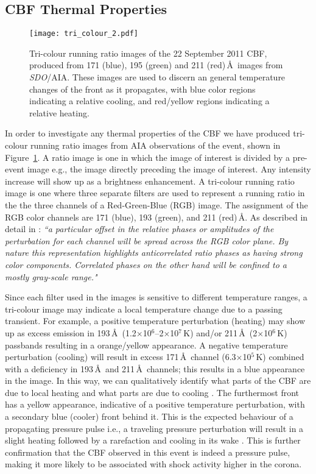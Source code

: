 \subsection{CBF Thermal Properties}
\begin{figure}[ht!]
	\begin{center}
		\texttt{[image: tri\_colour\_2.pdf]}
		\caption[Tri-colour running ratio images of a CBF.]{Tri-colour running ratio images of the 22 September 2011 CBF, produced from 171 (blue), 195 (green) and 211 (red)\,\AA~images from \emph{SDO}/AIA. These images are used to discern an general temperature changes of the front as it propagates, with blue color regions indicating a relative cooling, and red/yellow regions indicating a relative heating.}
		\label{fig:tri_color}
	\end{center}
\end{figure}
In order to investigate any thermal properties of the CBF we have produced tri-colour running ratio images from AIA observations of the event, shown in Figure~\ref{fig:tri_color}. A ratio image is one in which the image of interest is divided by a pre-event image e.g., the image directly preceding the image of interest. Any intensity increase will show up as a brightness enhancement. A tri-colour running ratio image is one where three separate filters are used to represent a running ratio in the the three channels of a Red-Green-Blue (RGB) image. The assignment of the RGB color channels are 171 (blue), 193 (green), and 211 (red)\,\AA. As described in detail in \citet{downs2012}: {\it ``a particular offset in the relative phases or amplitudes of the perturbation for each channel will be spread across the RGB color plane. By nature this representation highlights anticorrelated ratio phases as having strong color components. Correlated phases on the other hand will be confined to a mostly gray-scale range."} 

Since each filter used in the images is sensitive to different temperature ranges, a tri-colour image may indicate a local temperature change due to a passing transient. For example, a positive temperature perturbation (heating) may show up as excess emission in 193\,\AA~(1.2$\times$10$^6$--2$\times$10$^7$\,K) and/or 211\,\AA~(2$\times$10$^6$\,K) passbands resulting in a orange/yellow appearance. A negative temperature perturbation (cooling) will result in excess 171\,\AA~channel (6.3$\times$10$^5$\,K) combined with a deficiency in 193\,\AA~and 211\,\AA~channels; this results in a blue appearance in the image. In this way, we can qualitatively identify what parts of the CBF are due to local heating and what parts are due to cooling \citep{cohen2009, downs2012, cheng2012}. The furthermost front has a yellow appearance, indicative of a positive temperature perturbation, with a secondary blue (cooler) front behind it. This is the expected behaviour of a propagating pressure pulse i.e., a traveling pressure perturbation will result in a slight heating followed by a rarefaction and cooling in its wake \citet{downs2012}. This is further confirmation that the CBF observed in this event is indeed a pressure pulse, making it more likely to be associated with shock activity higher in the corona.

